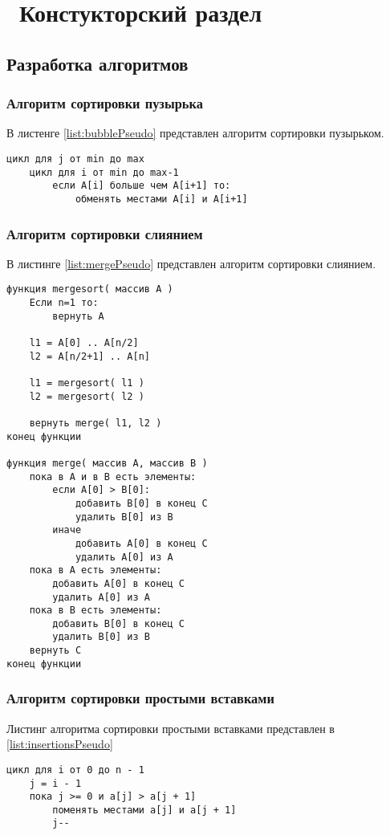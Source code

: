 \chapter{ Констукторский раздел}
\label{cha:design}
\section{ Разработка алгоритмов}

\subsection{ Алгоритм сортировки пузырька}
В листенге \ref{list:bubblePseudo} представлен алгоритм сортировки пузырьком.

\begin{lstlisting}[caption={Pseudocode of bubble sort}, label={list:bubblePseudo}]
цикл для j от min до max
    цикл для i от min до max-1
        если A[i] больше чем A[i+1] то:
            обменять местами A[i] и A[i+1]
\end{lstlisting}	


\subsection{ Алгоритм сортировки слиянием}
В листинге \ref{list:mergePseudo} представлен алгоритм сортировки слиянием.

\begin{lstlisting}[caption={Pseudocode of merge sort}, label={list:mergePseudo}]
функция mergesort( массив А )
    Если n=1 то:
        вернуть А

    l1 = A[0] .. A[n/2]
    l2 = A[n/2+1] .. A[n]

    l1 = mergesort( l1 )
    l2 = mergesort( l2 )

    вернуть merge( l1, l2 )
конец функции

функция merge( массив A, массив B )
    пока в A и в B есть элементы:
        если A[0] > B[0]:
            добавить B[0] в конец C
            удалить B[0] из B
        иначе
            добавить A[0] в конец C
            удалить A[0] из A
    пока в A есть элементы:
        добавить A[0] в конец C
        удалить A[0] из A
    пока в B есть элементы:
        добавить B[0] в конец C
        удалить B[0] из B
    вернуть C
конец функции
\end{lstlisting}	

\subsection{ Алгоритм сортировки простыми вставками}
Листинг алгоритма сортировки простыми вставками представлен в \ref{list:insertionsPseudo}

\begin{lstlisting}[caption={Pseudocode of insertions algorithm}, label={list:insertionsPseudo}]
цикл для i от 0 до n - 1
    j = i - 1
    пока j >= 0 и a[j] > a[j + 1] 
        поменять местами a[j] и a[j + 1]
        j--
\end{lstlisting}
